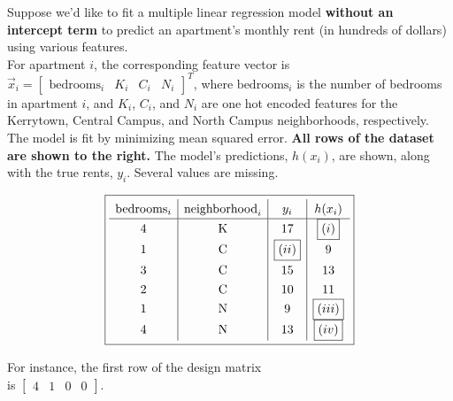 \documentclass[11pt]{article}
\begin{document}
\newpage

\begin{prob}
\begin{minipage}[t]{0.60\linewidth}
Suppose we'd like to fit a multiple linear regression model \textbf{without an intercept term} to predict an apartment's monthly rent (in hundreds of dollars) using various features. \\

For apartment $i$, the corresponding feature vector is $\vec x_i =
\begin{bmatrix}
\text{bedrooms}_i &
K_i &
C_i &
N_i
\end{bmatrix}^T$, where $\text{bedrooms}_i$ is the number of bedrooms in apartment $i$, and $K_i$, $C_i$, and $N_i$ are one hot encoded features for the Kerrytown, Central Campus, and North Campus neighborhoods, respectively. \\

The model is fit by minimizing mean squared error. \textbf{All rows of the dataset are shown to the right.} The model's predictions, $h(x_i)$, are shown, along with the true rents, $y_i$. Several values are missing.
\end{minipage}
\hfill
\begin{minipage}[t]{0.53\linewidth}
\vspace{0pt} %
\[
\boxed{\renewcommand{\arraystretch}{1.3}
\begin{array}{c|c|c|c}
\text{bedrooms}_i & \text{neighborhood}_i & y_i & h(x_i) \\
\hline
4 & \text{K} & 17 & \boxed{(i)} \\
1 & \text{C} & \boxed{(ii)} & 9 \\
3 & \text{C} & 15 & 13 \\
2 & \text{C} & 10 & 11 \\
1 & \text{N} & 9 & \boxed{(iii)} \\
4 & \text{N} & 13 & \boxed{(iv)}
\end{array}
\renewcommand{\arraystretch}{1}}
\]

\begin{center}
{\footnotesize For instance, the first row of the design matrix \\ is $\begin{bmatrix} 4 & 1 & 0 & 0 \end{bmatrix}$.}
\end{center}
\end{minipage}


\end{prob}
\end{document}
